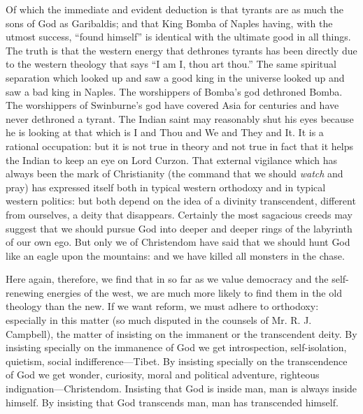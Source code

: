 \documentclass{book}
\begin{document}
Of which the immediate and evident deduction is that tyrants are as much the sons of God as Garibaldis; and that King Bomba of Naples having, with the utmost success, “found himself” is identical with the ultimate good in all things. The truth is that the western energy that dethrones tyrants has been directly due to the western theology that says “I am I, thou art thou.” The same spiritual separation which looked up and saw a good king in the universe looked up and saw a bad king in Naples. The worshippers of Bomba’s god dethroned Bomba. The worshippers of Swinburne’s god have covered Asia for centuries and have never dethroned a tyrant. The Indian saint may reasonably shut his eyes because he is looking at that which is I and Thou and We and They and It. It is a rational occupation: but it is not true in theory and not true in fact that it helps the Indian to keep an eye on Lord Curzon. That external vigilance which has always been the mark of Christianity (the command that we should \emph{watch} and pray) has expressed itself both in typical western orthodoxy and in typical western politics: but both depend on the idea of a divinity transcendent, different from ourselves, a deity that disappears. Certainly the most sagacious creeds may suggest that we should pursue God into deeper and deeper rings of the labyrinth of our own ego. But only we of Christendom have said that we should hunt God like an eagle upon the mountains: and we have killed all monsters in the chase.

Here again, therefore, we find that in so far as we value democracy and the self-renewing energies of the west, we are much more likely to find them in the old theology than the new. If we want reform, we must adhere to orthodoxy: especially in this matter (so much disputed in the counsels of Mr. R. J. Campbell), the matter of insisting on the immanent or the transcendent deity. By insisting specially on the immanence of God we get introspection, self-isolation, quietism, social indifference—Tibet. By insisting specially on the transcendence of God we get wonder, curiosity, moral and political adventure, righteous indignation—Christendom. Insisting that God is inside man, man is always inside himself. By insisting that God transcends man, man has transcended himself.
\end{document}
